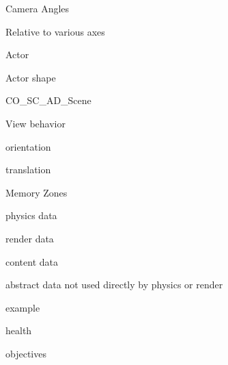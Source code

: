 \begin{DoxyItemize}
\begin{DoxyItemize}
\end{DoxyItemize}
\item Camera Angles
\begin{DoxyItemize}
\item Relative to various axes
\begin{DoxyItemize}
\item Actor
\item Actor shape
\item CO\_\-SC\_\-AD\_\-Scene
\end{DoxyItemize}
\item View behavior
\begin{DoxyItemize}
\item orientation
\item translation
\end{DoxyItemize}
\end{DoxyItemize}
\item Memory Zones
\begin{DoxyItemize}
\item physics data
\item render data
\item content data
\item abstract data not used directly by physics or render
\begin{DoxyItemize}
\item example
\begin{DoxyItemize}
\item health
\item objectives 
\end{DoxyItemize}
\end{DoxyItemize}
\end{DoxyItemize}
\end{DoxyItemize}